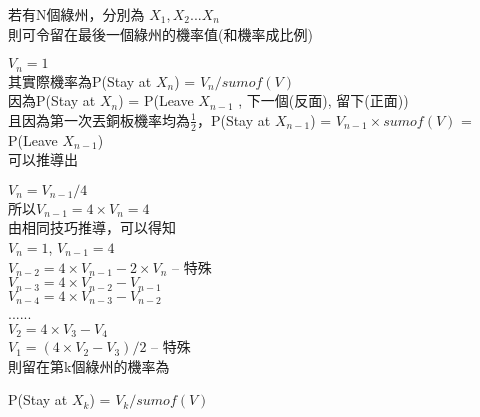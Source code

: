 \documentclass{article}
\begin{document}

\begin{CJK}{UTF8}{bsmi} %
若有N個綠州，分別為 $X_1, X_2 ... X_n $\\
則可令留在最後一個綠州的機率值(和機率成比例)

$ V_n = 1 $\\
其實際機率為P(Stay at $X_{n}$) = $V_n / sumof(V)$\\
因為P(Stay at $X_{n}$) = P(Leave $X_{n-1}$ , 下一個(反面), 留下(正面))\\
且因為第一次丟銅板機率均為$\frac{1}{2}$，P(Stay at $X_{n-1}$) = $V_{n-1}\times sumof(V)$ = P(Leave $X_{n-1}$)\\
可以推導出

$V_{n} = V_{n-1}/4$\\
所以$V_{n-1} = 4 \times V_{n} = 4$\\
由相同技巧推導，可以得知\\
$ V_n = 1 $, $V_{n-1} = 4$\\
$V_{n-2} = 4 \times V_{n-1} - 2 \times V_n$ -- 特殊\\
$V_{n-3} = 4 \times V_{n-2} - V_{n-1}$\\
$V_{n-4} = 4 \times V_{n-3} - V_{n-2}$\\
......\\
$V_{2} = 4 \times V_{3} - V_{4}$\\
$V_{1} = (4\times V_{2}-V_{3})/2$ -- 特殊\\

則留在第k個綠州的機率為

P(Stay at $X_{k}$) = $V_{k}/sumof(V)$
\end{CJK} %
\end{document}
